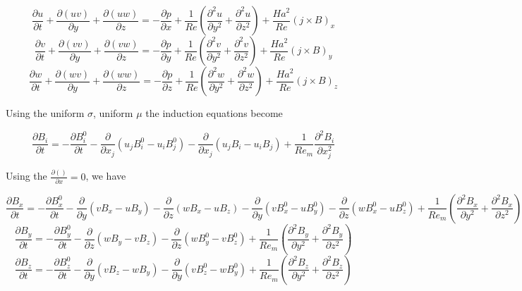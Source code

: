 \documentclass[11pt]{article}
\begin{document}
\begin{equation}
	\frac{\partial u}{\partial t} 
	+ \frac{\partial (u v)}{\partial y}
	+ \frac{\partial (u w)}{\partial z}
	= 
	- \frac{\partial p}{\partial x}
	+ \frac{1}{Re}
	\left(
	\frac{\partial^2 u}{\partial y^2}
	+\frac{\partial^2 u}{\partial z^2}
	\right)
	+ \frac{Ha^2}{Re}
	(j \times B)_x
\end{equation}
\begin{equation}
	\frac{\partial v}{\partial t} 
	+ \frac{\partial (v v)}{\partial y}
	+ \frac{\partial (v w)}{\partial z}
	= 
	- \frac{\partial p}{\partial y}
	+ \frac{1}{Re}
	\left(
	\frac{\partial^2 v}{\partial y^2}
	+\frac{\partial^2 v}{\partial z^2}
	\right)
	+ \frac{Ha^2}{Re}
	(j \times B)_y
\end{equation}
\begin{equation}
	\frac{\partial w}{\partial t} 
	+ \frac{\partial (w v)}{\partial y}
	+ \frac{\partial (w w)}{\partial z}
	= 
	- \frac{\partial p}{\partial z}
	+ \frac{1}{Re}
	\left(
	\frac{\partial^2 w}{\partial y^2}
	+\frac{\partial^2 w}{\partial z^2}
	\right)
	+ \frac{Ha^2}{Re}
	(j \times B)_z
\end{equation}

Using the uniform $\sigma$, uniform $\mu$ the induction equations become

\begin{equation}
	\frac{\partial B_i}{\partial t} 
	=
	- \frac{\partial B_i^0}{\partial t} 
	- \frac{\partial}{\partial x_j} (u_j B_i^0 - u_i B_j^0) 
	- \frac{\partial}{\partial x_j} (u_j B_i - u_i B_j) 
	+
	\frac{1}{Re_m}
	\frac{\partial^2 B_i}{\partial x_j^2}
\end{equation}

Using the $\frac{\partial ()}{\partial x} = 0$, we have

\begin{equation}
	\frac{\partial B_x}{\partial t} 
	=
	- \frac{\partial B_x^0}{\partial t} 
	- \frac{\partial}{\partial y} (v B_x - u B_y)
	- \frac{\partial}{\partial z} (w B_x - u B_z)
	- \frac{\partial}{\partial y} (v B_x^0 - u B_y^0)
	- \frac{\partial}{\partial z} (w B_x^0 - u B_z^0)	
	+
	\frac{1}{Re_m}
	\left(
	\frac{\partial^2 B_x}{\partial y^2}
	+ \frac{\partial^2 B_x}{\partial z^2}
	\right)
\end{equation}
\begin{equation}
	\frac{\partial B_y}{\partial t} 
	=
	- \frac{\partial B_y^0}{\partial t} 
	- \frac{\partial}{\partial z} (w B_y - v B_z)
	- \frac{\partial}{\partial z} (w B_y^0 - v B_z^0)	
	+
	\frac{1}{Re_m}
	\left(
	\frac{\partial^2 B_y}{\partial y^2}
	+ \frac{\partial^2 B_y}{\partial z^2}
	\right)
\end{equation}
\begin{equation}
	\frac{\partial B_z}{\partial t} 
	=
	- \frac{\partial B_z^0}{\partial t} 
	- \frac{\partial}{\partial y} (v B_z - w B_y)
	- \frac{\partial}{\partial y} (v B_z^0 - w B_y^0)
	+
	\frac{1}{Re_m}
	\left(
	\frac{\partial^2 B_z}{\partial y^2}
	+ \frac{\partial^2 B_z}{\partial z^2}
	\right)
\end{equation}
\end{document}

